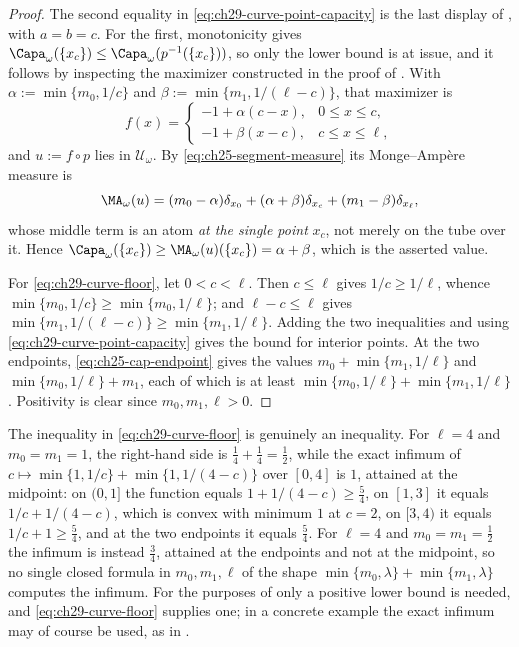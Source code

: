 \begin{proof}
The second equality in \eqref{eq:ch29-curve-point-capacity} is the last
display of , with \(a=b=c\).  For the
first, monotonicity gives
\(\Capa_\omega(\{x_c\})\leq\Capa_\omega(p^{-1}(\{x_c\}))\), so only the
lower bound is at issue, and it follows by inspecting the maximizer
constructed in the proof of .  With
\(\alpha:=\min\{m_0,1/c\}\) and \(\beta:=\min\{m_1,1/(\ell-c)\}\), that
maximizer is
\[
 f(x)=\begin{cases}
   -1+\alpha(c-x),&0\leq x\leq c,\\
   -1+\beta(x-c),&c\leq x\leq\ell,
 \end{cases}
\]
and \(u:=f\circ p\) lies in \(\mathcal U_\omega\).  By
\eqref{eq:ch25-segment-measure} its Monge--Amp\`ere measure is
\[
 \MA_\omega(u)=(m_0-\alpha)\delta_{x_0}
   +(\alpha+\beta)\delta_{x_c}
   +(m_1-\beta)\delta_{x_\ell},
\]
whose middle term is an atom \emph{at the single point} \(x_c\), not merely
on the tube over it.  Hence
\(\Capa_\omega(\{x_c\})\geq\MA_\omega(u)(\{x_c\})=\alpha+\beta\), which is
the asserted value.

For \eqref{eq:ch29-curve-floor}, let \(0<c<\ell\).  Then \(c\leq\ell\) gives
\(1/c\geq1/\ell\), whence
\(\min\{m_0,1/c\}\geq\min\{m_0,1/\ell\}\); and \(\ell-c\leq\ell\) gives
\(\min\{m_1,1/(\ell-c)\}\geq\min\{m_1,1/\ell\}\).  Adding the two
inequalities and using \eqref{eq:ch29-curve-point-capacity} gives the bound
for interior points.  At the two endpoints,
\eqref{eq:ch25-cap-endpoint} gives the values
\(m_0+\min\{m_1,1/\ell\}\) and \(\min\{m_0,1/\ell\}+m_1\), each of which is
at least \(\min\{m_0,1/\ell\}+\min\{m_1,1/\ell\}\).  Positivity is clear
since \(m_0,m_1,\ell>0\).
\end{proof}

\begin{remark}
\label{rem:ch29-floor-not-sharp}
The inequality in \eqref{eq:ch29-curve-floor} is genuinely an inequality.
For \(\ell=4\) and \(m_0=m_1=1\), the right-hand side is
\(\tfrac14+\tfrac14=\tfrac12\), while the exact infimum of
\(c\mapsto\min\{1,1/c\}+\min\{1,1/(4-c)\}\) over \([0,4]\) is \(1\), attained
at the midpoint: on \((0,1]\) the function equals \(1+1/(4-c)\geq\tfrac54\),
on \([1,3]\) it equals \(1/c+1/(4-c)\), which is convex with minimum \(1\) at
\(c=2\), on \([3,4)\) it equals \(1/c+1\geq\tfrac54\), and at the two
endpoints it equals \(\tfrac54\).  For \(\ell=4\) and
\(m_0=m_1=\tfrac12\) the infimum is instead \(\tfrac34\), attained at the
endpoints and not at the midpoint, so no single closed formula in
\(m_0,m_1,\ell\) of the shape \(\min\{m_0,\lambda\}+\min\{m_1,\lambda\}\)
computes the infimum.  For the purposes of
 only a positive lower bound is needed, and
\eqref{eq:ch29-curve-floor} supplies one; in a concrete example the exact
infimum may of course be used, as in
.
\end{remark}

